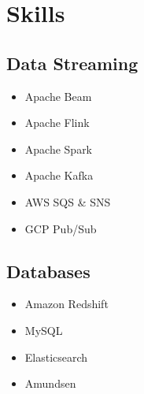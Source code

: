 \documentclass[letterpaper]{resume}
\begin{document}
\begin{minipage}[t]{0.27\textwidth} %


\section{Skills}

\subsection{Data Streaming}
\begin{itemize}
\item Apache Beam
\item Apache Flink
\item Apache Spark
\end{itemize}

\begin{itemize}
\item Apache Kafka
\item AWS SQS \& SNS
\item GCP Pub/Sub
\end{itemize}

\sectionspace %


\subsection{Databases}
\begin{itemize}
\item Amazon Redshift
\item MySQL
\end{itemize}

\begin{itemize}
\item Elasticsearch
\end{itemize}

\begin{itemize}
\item Amundsen
\end{itemize}

\sectionspace %


\end{minipage}
\end{document}
